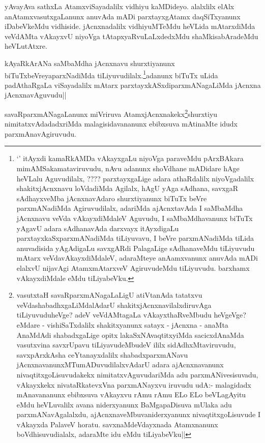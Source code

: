
\begin{artha}
yAvayAva sathxLa AtamxviSayadalilx vidhiyu kaMDideyo. alalxlilx elAlx anAtamxvasutxgaLanunx anuvAda mADi parxtayxgAtamx daqSiTxyanunx iDabeVkeMdu vidhiside. jAcnxnadalilx vidhiyuMTeMdu heVLida mAtarxdiMda veVdAMta vAkayxvU niyoVga tAtapxyaRvuLaLxdedxMdu shaMkisabAradeMdu heVLutAtxre. 
\end{artha}


\begin{artha}
kAyaRkArANa saMbaMdha jAcnxnavu shurxtiyanunx biTuTxbeVreyaparxNadiMda tiLiyuvudilalx.\footnote{`\stext' itAyxdi kamaRkAMDa vAkayxgaLu niyoVga paraveMdu pArxBAkara mimAMSakamataviruvudu, nAvu adanunx shoVdhane mADidare hAge heVLalu Aguvudilalx, ????  parxtayxgaLige adara athaRdalilx niyoVgadalilx shakitxjAcnxnavu loVdadiMda Agilalx, hAgU yAga sAdhana, savxgaR sAdhayxveMba jAcnxnavAdaro shurxtiyanunx biTuTx beVre parxmANadiMda Agiruvudilalx, adariMda ajAcnxtavAda I saMbaMdha jAcnxnavu veVda vAkayxdiMdaleV Aguvudu, I saMbaMdhavanunx biTuTx yAgavU adara sAdhanavAda darxvayx itAyxdigaLu parxtayxkaSxparxmANadiMda tiLiyuvavu, I beVre parxmANadiMda tiLida anuvadisida yAgAdigaLu savxgARdi PalagaLige sAdhanaveMdu tiLiyuvudu mAtarx veVdavAkayxdiMdaleV, adaraMteye anAamxvanunx anuvAda mADi elalxvU nijavAgi AtamxmAtarxveV AgiruvudeMdu tiLiyuvudu. barxhamx vAkayxdiMdale eMdu tiLiyabeVku.}adanunx biTuTx uLida padAthaRgaLa viSayadalilx mAtarx parxtayxkASxdiparxmANagaLiMda jAcnxna jAcnxnavAguvudu||
\end{artha}

\begin{artha}
savaRparxmANagaLanunx miVriruva AtamxjAcnxnakekx\footnote{vasutxtaH savaRparxmANagaLaLigU atiVtanAda tatatxvu veVdashabadhxgaLiMdalAdarU shakitxjAcnxnavilalxdiruvAga tiLiyuvuduheVge? adeV veVdAMtagaLa vAkayxthaRveMbudu heVgeVge? eMdare - vishiSaTxdalilx shakitxyanunx satayx - jAcnxna - anaMta AnaMdAdi shabadxgaLige opitx lakaSxNAvaqtitxyiMda sacicxdAnaMda vasutxvina savxrUpavu tiLiyavudeMbudeV ililx sidAdhxMtaviruvudu, savxpArxkAsha ceYtanayxdalilx shabadxparxmANavu jAcnxnavanunxMTumADuvudilalxvAdarU adara ajAcnxnavanunx nivaqtitxgoLisuvudakekx nimitatxvAguvudariMda adu parxmANivesisuvadu, vAkayxkekx nivataRkatevxVna parxmANayxvu iruvudu udA:- malagidadx mAnavananunx ebibxsuva vAkayxvu rAmu rAmu ELo ELo beVLagAyitu eMdu heVLuvalilx avana niderxyanunx BaMgapaDisuva mUlaka adu parxmANavAgalalxdu, ajAcnxnaveMbuvaniderxyanunx nivaqtitxgoLisuvude I vAkayxda PalaveV horatu. savxnaMdeVdayxnada Atamxnanunx boVdhisuvudialalx, adaraMte idu eMdu tiLiyabeVku||}shurxtiyu nimitatxvAdadadxriMda 
malagisidavananunx ebibxsuva mAtinaMte idudx parxmAnavAgiruvudu.
\end{artha}


